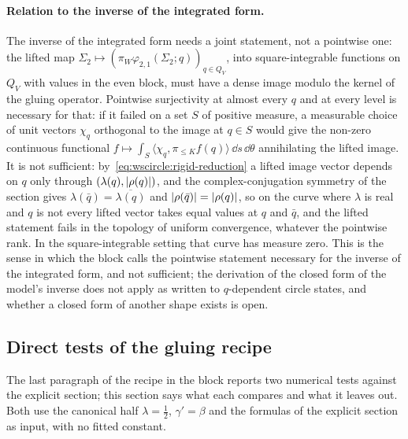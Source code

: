 \paragraph{Relation to the inverse of the integrated form.}
The inverse of the integrated form needs a joint statement, not a pointwise one: the lifted map $\Sigma_2 \mapsto (\pi_W \varphi_{2,1}(\Sigma_2; q))_{q \in Q_V}$, into square-integrable functions on $Q_V$ with values in the even block, must have a dense image modulo the kernel of the gluing operator.
Pointwise surjectivity at almost every $q$ and at every level is necessary for that: if it failed on a set $S$ of positive measure, a measurable choice of unit vectors $\chi_q$ orthogonal to the image at $q \in S$ would give the non-zero continuous functional $f \mapsto \int_S \langle \chi_q, \pi_{\leq K} f(q) \rangle \, \dd s \, \dd\theta$ annihilating the lifted image.
It is not sufficient: by~\eqref{eq:wscircle:rigid-reduction} a lifted image vector depends on $q$ only through $(\lambda(q), {|\rho(q)|})$, and the complex-conjugation symmetry of the section gives $\lambda(\bar q) = \overline{\lambda(q)}$ and ${|\rho(\bar q)|} = {|\rho(q)|}$, so on the curve where $\lambda$ is real and $q$ is not every lifted vector takes equal values at $q$ and $\bar q$, and the lifted statement fails in the topology of uniform convergence, whatever the pointwise rank.
In the square-integrable setting that curve has measure zero.
This is the sense in which the block calls the pointwise statement necessary for the inverse of the integrated form, and not sufficient; the derivation of the closed form of the model's inverse does not apply as written to $q$-dependent circle states, and whether a closed form of another shape exists is open.

\subsection{Direct tests of the gluing recipe}
\label{sec:wscircle:tests}


The last paragraph of the recipe in the block reports two numerical tests against the explicit section; this section says what each compares and what it leaves out.
Both use the canonical half $\lambda = \tfrac{1}{2}$, $\gamma' = \beta$ and the formulas of the explicit section as input, with no fitted constant.

